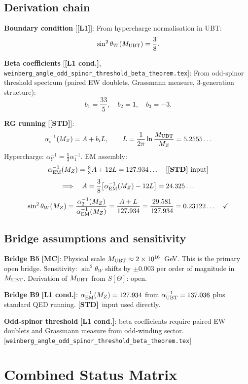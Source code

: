 \documentclass[12pt,a4paper]{article}
\theoremstyle{remark}\newtheorem{remark}[theorem]{Remark}
\newcommand{\Lo}{\textbf{[L1]}}
\newcommand{\Lc}{\textbf{[L1 cond.]}}
\newcommand{\MC}{\textbf{[MC]}}
\newcommand{\STD}{\textbf{[STD]}}
\begin{document}
\subsection{Derivation chain}

\textbf{Boundary condition} [\Lo]:
From hypercharge normalisation in UBT:
\[
  \sin^2\theta_W(M_{\rm UBT}) = \frac{3}{8}.
\]

\textbf{Beta coefficients} [\Lc, \texttt{weinberg\_angle\_odd\_spinor\_threshold\_beta\_theorem.tex}]:
From odd-spinor threshold spectrum (paired EW doublets, Grassmann measure,
3-generation structure):
\[
  b_1 = \frac{33}{5}, \quad b_2 = 1, \quad b_3 = -3.
\]

\textbf{RG running} [\STD]:
\[
  \alpha_i^{-1}(M_Z) = A + b_i L,
  \qquad
  L = \frac{1}{2\pi}\ln\frac{M_{\rm UBT}}{M_Z} = 5.2555\ldots
\]
Hypercharge: $\alpha_Y^{-1} = \tfrac{5}{3}\alpha_1^{-1}$.
EM assembly:
\[
  \alpha_{\rm EM}^{-1}(M_Z)
  = \tfrac{8}{3}A + 12L = 127.934\ldots \quad [\STD\ {\rm input}]
\]
\[
  \Longrightarrow\quad
  A = \frac{3}{8}\bigl[\alpha_{\rm EM}^{-1}(M_Z) - 12L\bigr]
  = 24.325\ldots
\]
\[
  \sin^2\theta_W(M_Z)
  = \frac{\alpha_2^{-1}(M_Z)}{\alpha_{\rm EM}^{-1}(M_Z)}
  = \frac{A + L}{127.934}
  = \frac{29.581}{127.934}
  = 0.23122\ldots \quad \checkmark
\]

\subsection{Bridge assumptions and sensitivity}

\begin{gapbox}
\textbf{Bridge B5} \MC: Physical scale $M_{\rm UBT} \approx 2\times10^{16}$~GeV.
This is the primary open bridge. Sensitivity: $\sin^2\theta_W$ shifts by
$\pm0.003$ per order of magnitude in $M_{\rm UBT}$.
Derivation of $M_{\rm UBT}$ from $S[\Theta]$: open.

\textbf{Bridge B9} \Lc: $\alpha_{\rm EM}^{-1}(M_Z) = 127.934$ from
$\alpha_{\rm UBT}^{-1}=137.036$ plus standard QED running.
\STD\ input used directly.

\textbf{Odd-spinor threshold} \Lc: beta coefficients require
paired EW doublets and Grassmann measure from odd-winding sector.
[\texttt{weinberg\_angle\_odd\_spinor\_threshold\_beta\_theorem.tex}]
\end{gapbox}

\section{Combined Status Matrix}
\label{sec:matrix}
\end{document}

